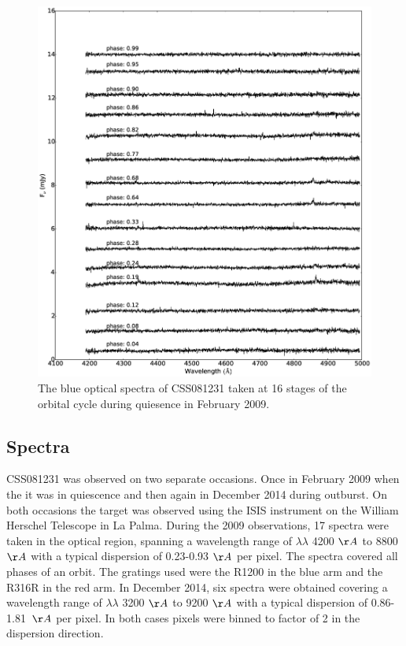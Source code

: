 \documentclass[a4paper,fleqn,usenatbib]{mnras}
\begin{document}
\begin{figure}
\centering
\includegraphics[width=\textwidth]{images/blue_spectra.eps}
\caption[Caption for spectra]{The blue optical spectra of CSS081231 taken at 16 stages of the orbital cycle during quiesence in February 2009.  }
\label{fig:spectra-quiescent-blue}
\end{figure}

\subsection{Spectra}
\label{sec:spectra} %
CSS081231 was observed on two separate occasions. Once in February 2009 when the it was in quiescence and then again in December 2014 during outburst. On both occasions the target was observed using the ISIS instrument on the William Herschel Telescope in La Palma. During the 2009 observations, 17 spectra were taken in the optical region, spanning a wavelength range of $\lambda \lambda$ 4200 $\AA$ to 8800 $\AA$ with a typical dispersion of 0.23-0.93 $\AA$ per pixel. The spectra covered all phases of an orbit. The gratings used were the R1200 in the blue arm and the R316R in the red arm. In December 2014, six spectra were obtained covering a wavelength range of $\lambda\lambda$ 3200 $\AA$ to 9200 $\AA$ with a typical dispersion of 0.86-1.81~$\AA$ per pixel. In both cases pixels were binned to factor of 2 in the dispersion direction. 
\end{document}
